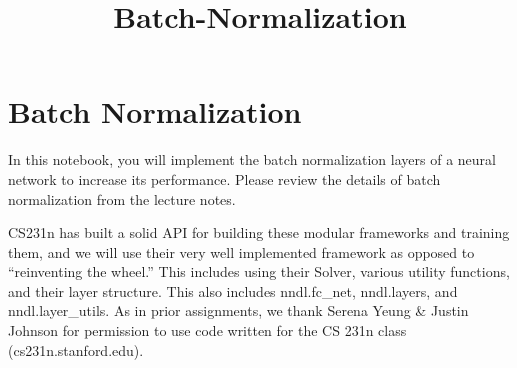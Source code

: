 \documentclass[11pt]{article}
\title{Batch-Normalization}
\begin{document}
    
    
    \maketitle
    
    

    
    \hypertarget{batch-normalization}{%
\section{Batch Normalization}\label{batch-normalization}}

In this notebook, you will implement the batch normalization layers of a
neural network to increase its performance. Please review the details of
batch normalization from the lecture notes.

CS231n has built a solid API for building these modular frameworks and
training them, and we will use their very well implemented framework as
opposed to ``reinventing the wheel.'' This includes using their Solver,
various utility functions, and their layer structure. This also includes
nndl.fc\_net, nndl.layers, and nndl.layer\_utils. As in prior
assignments, we thank Serena Yeung \& Justin Johnson for permission to
use code written for the CS 231n class (cs231n.stanford.edu).
\end{document}
